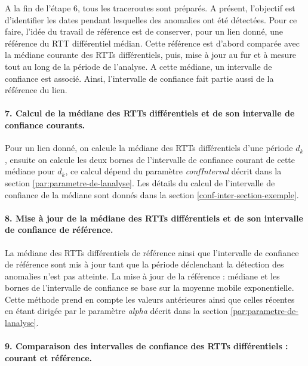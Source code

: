 A la fin de l'étape 6, tous les traceroutes sont préparés. A présent, l'objectif est d'identifier les dates pendant lesquelles des anomalies ont été détectées. Pour ce faire, l'idée du travail de référence est de conserver, pour un lien donné, une référence du RTT différentiel médian.  Cette référence est d'abord comparée avec la médiane courante des RTTs différentiels,  puis,  mise à jour au fur et à mesure   tout au long de la période de l'analyse. A cette médiane, un intervalle de confiance est associé. Ainsi, l'intervalle de confiance fait partie aussi de la référence du lien. 


\paragraph{7. Calcul de la médiane des RTTs différentiels et  de son intervalle de confiance courants.} Pour un lien donné, on calcule la médiane des RTTs différentiels d'une période $d_k$, ensuite on calcule les deux bornes de l'intervalle de confiance  courant de cette médiane pour $d_k$, ce calcul dépend  du paramètre \textit{confInterval} décrit dans la section \ref{par:parametre-de-lanalyse}.   Les détails du  calcul de l'intervalle de confiance de la médiane sont donnés dans la section \ref{conf-inter-section-exemple}. 


\paragraph{8. Mise à jour de la médiane  des RTTs différentiels et de son intervalle  de confiance de  référence.} La médiane des RTTs différentiels de référence ainsi que l'intervalle de confiance de référence sont mis à jour tant que la période déclenchant la détection des anomalies n'est pas atteinte.  La mise à jour de la référence : médiane et les bornes de l'intervalle de confiance se base sur la moyenne mobile exponentielle. Cette méthode prend en compte les valeurs antérieures ainsi que celles récentes en étant dirigée par le paramètre \textit{alpha} décrit dans la section \ref{par:parametre-de-lanalyse}.


\paragraph{9. Comparaison des intervalles de confiance  des RTTs différentiels : courant et référence.} 


